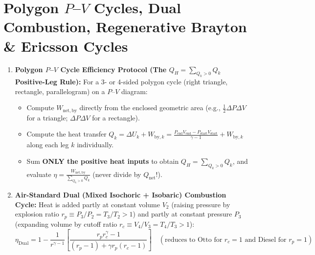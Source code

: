 \section{Polygon $P$--$V$ Cycles, Dual Combustion, Regenerative Brayton \& Ericsson Cycles}\label{sec:09.8}

\begin{formulacard}
\begin{enumerate}
  \item \textbf{Polygon $P$--$V$ Cycle Efficiency Protocol (The $Q_H = \sum_{Q_k > 0} Q_k$ Positive-Leg Rule):}
  For a 3- or 4-sided polygon cycle (right triangle, rectangle, parallelogram) on a $P$--$V$ diagram:
  \begin{itemize}
    \item Compute $W_{\mathrm{net,by}}$ directly from the enclosed geometric area (e.g., $\frac{1}{2}\Delta P\Delta V$ for a triangle; $\Delta P\Delta V$ for a rectangle).
    \item Compute the heat transfer $Q_k = \Delta U_k + W_{\mathrm{by},k} = \frac{P_{\mathrm{end}}V_{\mathrm{end}} - P_{\mathrm{start}}V_{\mathrm{start}}}{\gamma - 1} + W_{\mathrm{by},k}$ along each leg $k$ individually.
    \item Sum \textbf{ONLY the positive heat inputs} to obtain $Q_H = \sum_{Q_k > 0} Q_k$, and evaluate $\boxed{\eta = \frac{W_{\mathrm{net,by}}}{\sum_{Q_k > 0} Q_k}}$ (never divide by $Q_{\mathrm{net}}$!).
  \end{itemize}
  \item \textbf{Air-Standard Dual (Mixed Isochoric + Isobaric) Combustion Cycle:}
  Heat is added partly at constant volume $V_2$ (raising pressure by explosion ratio $r_p \equiv P_3/P_2 = T_3/T_2 > 1$) and partly at constant pressure $P_3$ (expanding volume by cutoff ratio $r_c \equiv V_4/V_3 = T_4/T_3 > 1$):
  \begin{equation}\label{eq:09:dual-cycle}
    \boxed{\eta_{\mathrm{Dual}} = 1 - \frac{1}{r^{\gamma - 1}}\left[\frac{r_p r_c^\gamma - 1}{(r_p - 1) + \gamma r_p(r_c - 1)}\right]} \quad (\text{reduces to Otto for } r_c=1 \text{ and Diesel for } r_p=1)

\end{equation}
\end{enumerate}
\end{formulacard}
